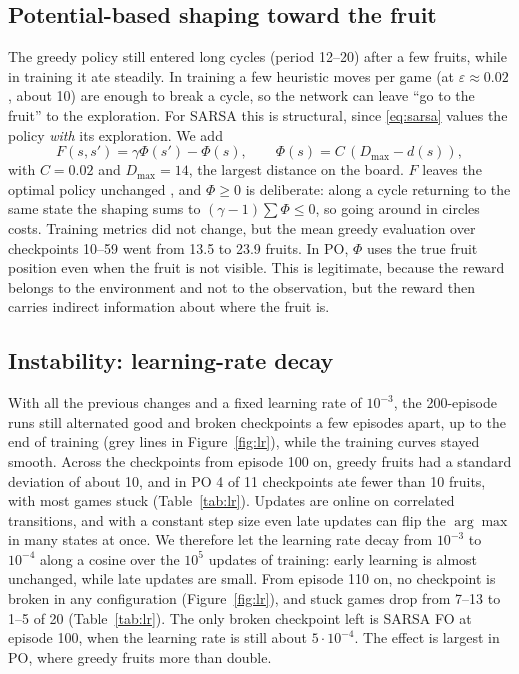 \documentclass{article}
\begin{document}
\subsection{Potential-based shaping toward the fruit}
\label{sec:shaping}
The greedy policy still entered long cycles (period 12--20) after a few fruits, while in training it ate steadily.
In training a few heuristic moves per game (at $\varepsilon\approx0.02$, about 10) are enough to break a cycle, so the network can leave ``go to the fruit'' to the exploration.
For SARSA this is structural, since \eqref{eq:sarsa} values the policy \emph{with} its exploration.
We add
\begin{equation}
F(s,s') = \gamma\Phi(s')-\Phi(s), \qquad \Phi(s) = C\,(D_{\max}-d(s)),
\label{eq:shaping}
\end{equation}
with $C=0.02$ and $D_{\max}=14$, the largest distance on the board.
$F$ leaves the optimal policy unchanged \cite{ng1999}, and $\Phi\ge0$ is deliberate: along a cycle returning to the same state the shaping sums to $(\gamma-1)\sum\Phi\le0$, so going around in circles costs.
Training metrics did not change, but the mean greedy evaluation over checkpoints 10--59 went from 13.5 to 23.9 fruits.
In PO, $\Phi$ uses the true fruit position even when the fruit is not visible. This is legitimate, because the reward belongs to the environment and not to the observation, but the reward then carries indirect information about where the fruit is.

\subsection{Instability: learning-rate decay}
\label{sec:lr}
With all the previous changes and a fixed learning rate of $10^{-3}$, the 200-episode runs still alternated good and broken checkpoints a few episodes apart, up to the end of training (grey lines in Figure~\ref{fig:lr}), while the training curves stayed smooth.
Across the checkpoints from episode 100 on, greedy fruits had a standard deviation of about 10, and in PO 4 of 11 checkpoints ate fewer than 10 fruits, with most games stuck (Table~\ref{tab:lr}).
Updates are online on correlated transitions, and with a constant step size even late updates can flip the $\arg\max$ in many states at once.
We therefore let the learning rate decay from $10^{-3}$ to $10^{-4}$ along a cosine over the $10^5$ updates of training: early learning is almost unchanged, while late updates are small.
From episode 110 on, no checkpoint is broken in any configuration (Figure~\ref{fig:lr}), and stuck games drop from 7--13 to 1--5 of 20 (Table~\ref{tab:lr}).
The only broken checkpoint left is SARSA FO at episode 100, when the learning rate is still about $5\cdot10^{-4}$.
The effect is largest in PO, where greedy fruits more than double.
\end{document}

